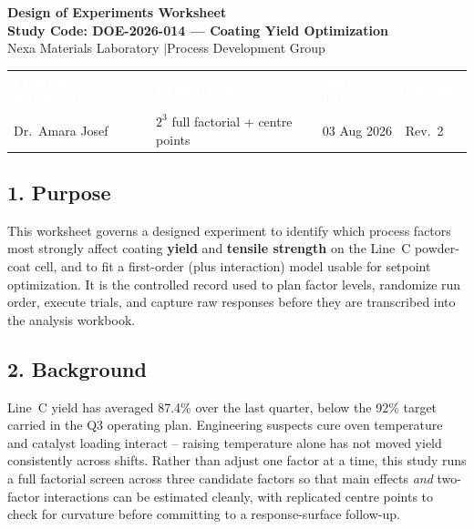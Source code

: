 \begin{center}
{\Huge\bfseries\color{doeprimary} Design of Experiments Worksheet}\\[0.4em]
{\large\color{doeaccent}\textbf{Study Code: DOE-2026-014 --- Coating Yield Optimization}}\\[0.6em]
{\small\color{black!60} Nexa Materials Laboratory \quad$\vert$\quad Process Development Group}
\end{center}

\vspace{0.6em}
\noindent\begin{tabularx}{\linewidth}{@{}Y Y Y Y@{}}
\textcolor{white}{\textbf{Principal Investigator}} & \textcolor{white}{\textbf{Design Type}} & \textcolor{white}{\textbf{Date Issued}} & \textcolor{white}{\textbf{Revision}} \\
Dr.\ Amara Josef & \(2^{3}\) full factorial + centre points & 03 Aug 2026 & Rev.\ 2 \\
\end{tabularx}

\vspace{1.0em}

\subsection*{1. Purpose}
This worksheet governs a designed experiment to identify which process factors most strongly
affect coating \textbf{yield} and \textbf{tensile strength} on the Line~C powder-coat cell, and
to fit a first-order (plus interaction) model usable for setpoint optimization. It is the
controlled record used to plan factor levels, randomize run order, execute trials, and capture
raw responses before they are transcribed into the analysis workbook.

\subsection*{2. Background}
Line~C yield has averaged 87.4\% over the last quarter, below the 92\% target carried in the
Q3 operating plan. Engineering suspects cure oven temperature and catalyst loading interact --
raising temperature alone has not moved yield consistently across shifts. Rather than adjust
one factor at a time, this study runs a full factorial screen across three candidate factors so
that main effects \emph{and} two-factor interactions can be estimated cleanly, with replicated
centre points to check for curvature before committing to a response-surface follow-up.

